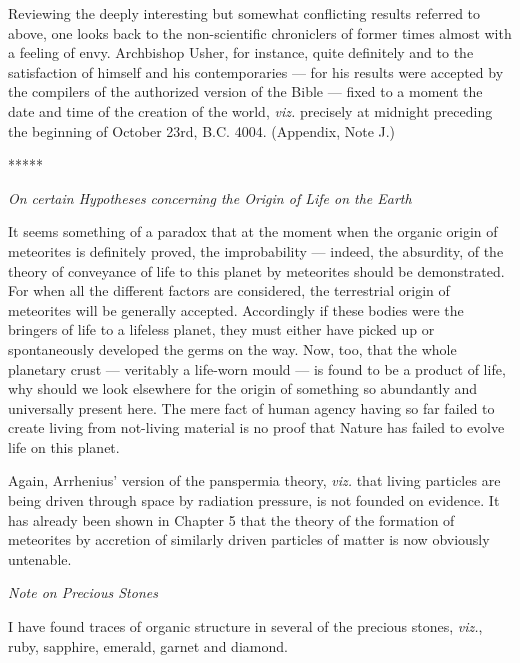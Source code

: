 \documentclass[a4paper, 12pt, oneside]{article}
\begin{document}
Reviewing the deeply interesting but somewhat conflicting results referred to above, one looks back to the non-scientific chroniclers of former times almost with a feeling of envy. Archbishop Usher, for instance, quite definitely and to the satisfaction of himself and his contemporaries --- for his results were accepted by the compilers of the authorized version of the Bible --- fixed to a moment the date and time of the creation of the world, \emph{viz.} precisely at midnight preceding the beginning of October 23rd, B.C. 4004. (Appendix, Note J.)

\centerline{*\hspace{15mm}*\hspace{15mm}*\hspace{15mm}*\hspace{15mm}*}
\bigskip

\centerline{\emph{On certain Hypotheses concerning the Origin of Life on the Earth}}

It seems something of a paradox that at the moment when the organic origin of meteorites is definitely proved, the improbability --- indeed, the absurdity, of the theory of conveyance of life to this planet by meteorites should be demonstrated. For when all the different factors are considered, the terrestrial origin of meteorites will be generally accepted. Accordingly if these bodies were the bringers of life to a lifeless planet, they must either have picked up or spontaneously developed the germs on the way. Now, too, that the whole planetary crust --- veritably a life-worn mould --- is found to be a product of life, why should we look elsewhere for the origin of something so abundantly and universally present here. The mere fact of human agency having so far failed to create living from not-living material is no proof that Nature has failed to evolve life on this planet.

Again, Arrhenius' version of the panspermia theory, \emph{viz.} that living particles are being driven through space by radiation pressure, is not founded on evidence. It has already been shown in Chapter 5 that the theory of the formation of meteorites by accretion of similarly driven particles of matter is now obviously untenable.

\centerline{\emph{Note on Precious Stones}}

I have found traces of organic structure in several of the precious stones, \emph{viz.}, ruby, sapphire, emerald, garnet and diamond.
\end{document}
